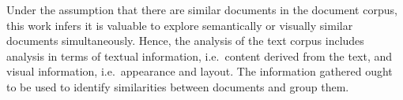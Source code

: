 Under the assumption that there are similar documents in the document corpus, 
this work infers it is valuable to explore semantically or visually similar documents simultaneously.
Hence, the analysis of the text corpus includes analysis in terms of textual information, i.e.\ content derived from the text, 
and visual information, i.e.\ appearance and layout.
The information gathered ought to be used to identify similarities between documents and group them.